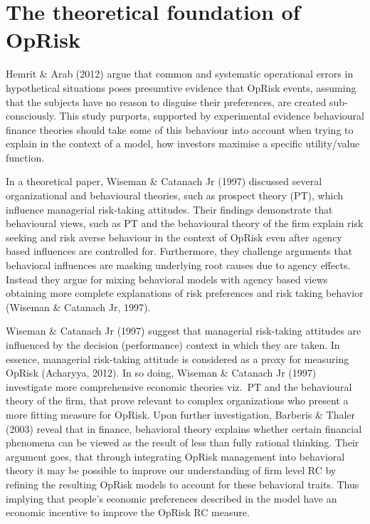 \documentclass{DissertateUSU}
\begin{document}
\section{The theoretical foundation of OpRisk}
\label{sec:The theoretical foundation of OpRisk}

Hemrit \& Arab (2012) argue that common and systematic operational
errors in hypothetical situations poses presumtive evidence that OpRisk
events, assuming that the subjects have no reason to disguise their
preferences, are created sub-consciously. This study purports, supported
by experimental evidence behavioural finance theories should take some
of this behaviour into account when trying to explain in the context of
a model, how investors maximise a specific utility/value
function.\medskip

In a theoretical paper, Wiseman \& Catanach Jr (1997) discussed several
organizational and behavioural theories, such as prospect theory (PT),
which influence managerial risk-taking attitudes. Their findings
demonstrate that behavioural views, such as PT and the behavioural
theory of the firm explain risk seeking and risk averse behaviour in the
context of OpRisk even after agency based influences are controlled for.
Furthermore, they challenge arguments that behavioral influences are
masking underlying root causes due to agency effects. Instead they argue
for mixing behavioral models with agency based views obtaining more
complete explanations of risk preferences and risk taking behavior
(Wiseman \& Catanach Jr, 1997). \medskip

Wiseman \& Catanach Jr (1997) suggest that managerial risk-taking
attitudes are influenced by the decision (performance) context in which
they are taken. In essence, managerial risk-taking attitude is
considered as a proxy for measuring OpRisk (Acharyya, 2012). In so
doing, Wiseman \& Catanach Jr (1997) investigate more comprehensive
economic theories viz.~PT and the behavioural theory of the firm, that
prove relevant to complex organizations who present a more fitting
measure for OpRisk. Upon further investigation, Barberis \& Thaler
(2003) reveal that in finance, behavioral theory explains whether
certain financial phenomena can be viewed as the result of less than
fully rational thinking. Their argument goes, that through integrating
OpRisk management into behavioral theory it may be possible to improve
our understanding of firm level RC by refining the resulting OpRisk
models to account for these behavioral traits. Thus implying that
people's economic preferences described in the model have an economic
incentive to improve the OpRisk RC measure. \medskip
\end{document}
